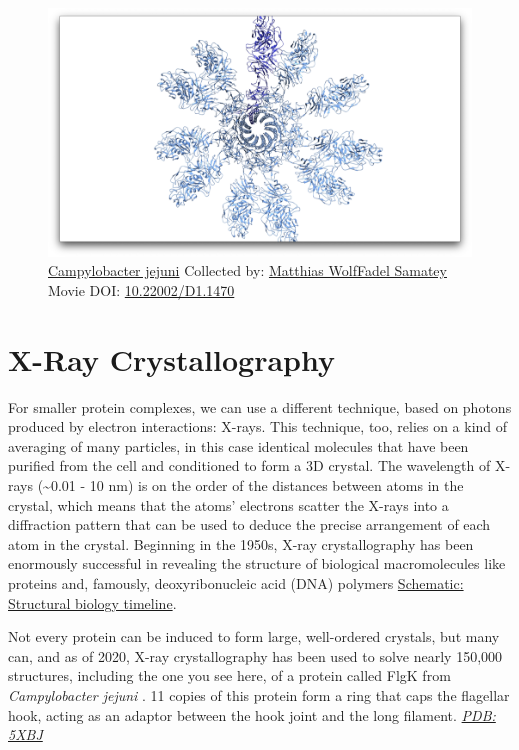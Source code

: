 \documentclass[]{tufte-book}
\begin{document}
\begin{figure}
\includegraphics{movie_stills/1_8} \caption[\protect\hyperlink{tree}{Campylobacter jejuni} Collected by:
\protect\hyperlink{matthias_wolffadel_samatey}{Matthias WolfFadel
Samatey} Movie DOI:
\href{https://doi.org/10.22002/D1.1470}{10.22002/D1.1470}]{\protect\hyperlink{tree}{Campylobacter jejuni} Collected by:
\protect\hyperlink{matthias_wolffadel_samatey}{Matthias WolfFadel
Samatey} Movie DOI:
\href{https://doi.org/10.22002/D1.1470}{10.22002/D1.1470}}\label{fig:1-8}
\end{figure}

\section{X-Ray Crystallography}\label{x-ray-crystallography}

For smaller protein complexes, we can use a different technique, based
on photons produced by electron interactions: X-rays. This technique,
too, relies on a kind of averaging of many particles, in this case
identical molecules that have been purified from the cell and
conditioned to form a 3D crystal. The wavelength of X-rays
(\textasciitilde{}0.01 - 10 nm) is on the order of the distances between
atoms in the crystal, which means that the atoms' electrons scatter the
X-rays into a diffraction pattern that can be used to deduce the precise
arrangement of each atom in the crystal. Beginning in the 1950s, X-ray
crystallography has been enormously successful in revealing the
structure of biological macromolecules like proteins and, famously,
deoxyribonucleic acid (DNA) polymers
\protect\hyperlink{Structural_biology_timeline}{Schematic: Structural
biology timeline}.

Not every protein can be induced to form large, well-ordered crystals,
but many can, and as of 2020, X-ray crystallography has been used to
solve nearly 150,000 structures, including the one you see here, of a
protein called FlgK from \emph{Campylobacter jejuni}
\citep{bulieris2017}. 11 copies of this protein form a ring that caps
the flagellar hook, acting as an adaptor between the hook joint and the
long filament. \href{http://rcsb.org/structure/5XBJ}{\emph{PDB: 5XBJ}}
\end{document}
